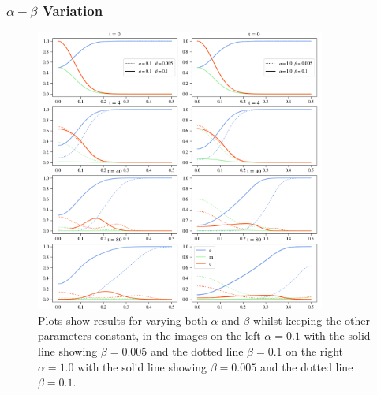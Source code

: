 \subsubsection*{$\alpha - \beta$ Variation}
\begin{figure}[h]
    \centering
    \includegraphics[width=0.85\textwidth]{resources/images/alpha_beta_variation.png}
    \caption{Plots show results for varying both $\alpha$ and $\beta$ whilst keeping the other parameters constant, in the images on the left $\alpha=0.1$ with the solid line showing $\beta = 0.005$ and the dotted line $\beta=0.1$ on the right $\alpha=1.0$ with the solid line showing $\beta = 0.005$ and the dotted line $\beta=0.1$.}
    \label{fig:alpha_beta_variation}
\end{figure}
